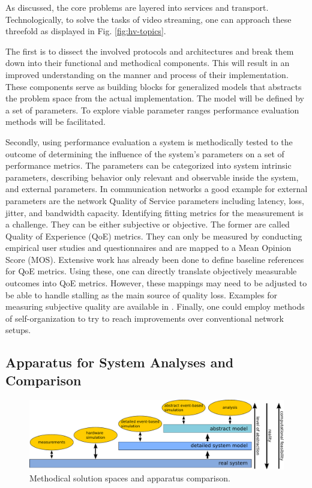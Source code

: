 As discussed, the core problems are layered into services and transport. Technologically, to solve the tasks of video streaming, one can approach these  threefold as displayed in Fig. \ref{fig:hv-topics}.

The first is to dissect the involved protocols and architectures and break them down into their functional and methodical components. This will result in an improved understanding on the manner and process of their implementation. These components serve as building blocks for generalized models that abstracts the problem space from the actual implementation. The model will be defined by a set of parameters. To explore viable parameter ranges performance evaluation methods will be facilitated.


Secondly, using performance evaluation a system is methodically tested to the outcome of determining the influence of the system's parameters on a set of performance metrics. The parameters can be categorized into system intrinsic parameters, describing behavior only relevant and observable inside the system, and external parameters. In communication networks a good example for external parameters are the network Quality of Service parameters including latency, loss, jitter, and bandwidth capacity. Identifying fitting metrics for the measurement is a challenge. They can be either subjective or objective. The former are called Quality of Experience (QoE) metrics. They can only be measured by conducting empirical user studies and questionnaires and are mapped to a Mean Opinion Score (MOS). Extensive work has already been done to define baseline references for QoE metrics. Using these, one can directly translate objectively measurable outcomes into QoE metrics. However, these mappings may need to be adjusted to be able to handle stalling as the main source of quality loss. Examples for measuring subjective quality are available in \cite{gustafsson2008measuring, ketyo2010qoe}. 
Finally, one could employ methods of self-organization to try to reach improvements over conventional network setups.


\subsection{Apparatus for System Analyses and Comparison}

\begin{figure}[htbp]
\centering
\includegraphics[width=1.0\textwidth]{images/expose/apparatus-new.pdf}
\caption{Methodical solution spaces and apparatus comparison.}
\label{fig:appcomp}
\end{figure}

